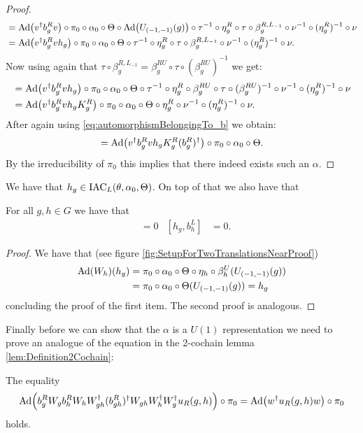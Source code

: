 \documentclass[12pt,a4paper,twoside]{article}
\numberwithin{equation}{section}
\begin{document}
\begin{proof}
	\begin{align}
		&=\Ad{v^\dagger b_g^R v}\circ\pi_0\circ\alpha_0\circ\Theta\circ\Ad{U_{(-1,-1)}(g)}\circ\tau^{-1}\circ\eta_g^R\circ\tau\circ\beta_g^{R,L_{-1}}\circ\nu^{-1}\circ(\eta_g^R)^{-1}\circ\nu\\
		&=\Ad{v^\dagger b_g^R vh_g}\circ\pi_0\circ\alpha_0\circ\Theta\circ\tau^{-1}\circ\eta_g^R\circ\tau\circ\beta_g^{R,L_{-1}}\circ\nu^{-1}\circ(\eta_g^R)^{-1}\circ\nu.
	\end{align}
	Now using again that $\tau\circ\beta_g^{R,L_{-1}}=\beta_{g}^{RU}\circ\tau\circ(\beta_g^{RU})^{-1}$ we get:
	\begin{align}
		&=\Ad{v^\dagger b_g^R vh_g}\circ\pi_0\circ\alpha_0\circ\Theta\circ\tau^{-1}\circ\eta_g^R\circ\beta_{g}^{RU}\circ\tau\circ(\beta_g^{RU})^{-1}\circ\nu^{-1}\circ(\eta_g^R)^{-1}\circ\nu\\
		&=\Ad{v^\dagger b_g^R vh_gK_g^R}\circ\pi_0\circ\alpha_0\circ\Theta\circ\eta_g^R\circ\nu^{-1}\circ(\eta_g^R)^{-1}\circ\nu.
	\end{align}
	After again using \eqref{eq:automorphismBelongingTo_b} we obtain:
	\begin{align}
		=\Ad{v^\dagger b_g^R vh_gK_g^R(b_g^R)^\dagger}\circ\pi_0\circ\alpha_0\circ\Theta.
	\end{align}
	By the irreducibility of $\pi_0$ this implies that there indeed exists such an $\alpha$.
\end{proof}
We have that $h_g\in\textrm{IAC}_L(\theta,\alpha_0,\Theta)$. On top of that we also have that
\begin{lemma}\label{lem:W_g_And_h_g_Commute}
	For all $g,h\in G$ we have that
	\begin{align}
		[h_g,W_h]&=0&[h_g,b_h^L]&=0.
	\end{align}
\end{lemma}
\begin{proof}
	We have that (see figure \ref{fig:SetupForTwoTranslationsNearProof})
	\begin{align}
		\Ad{W_h}(h_g)&=\pi_0\circ\alpha_0\circ\Theta\circ\eta_h\circ\beta_h^U(U_{(-1,-1)}(g))\\
		&=\pi_0\circ\alpha_0\circ\Theta(U_{(-1,-1)}(g))=h_g
	\end{align}
	concluding the proof of the first item. The second proof is analogous.
\end{proof}
Finally before we can show that the $\alpha$ is a $U(1)$ representation we need to prove an analogue of the equation in the 2-cochain lemma \ref{lem:Definition2Cochain}:
\begin{lemma}\label{lem:translating_u_R_To_The_Right_identity}
The equality
\begin{equation}
\Ad{b_g^R W_g b_h^R W_h W_{gh}^\dagger (b_{gh}^R)^\dagger W_{gh}W_h^\dagger W_g^\dagger u_R(g,h)}\circ\pi_0=\Ad{w^\dagger u_R(g,h) w}\circ\pi_0
\end{equation}
holds.
\end{lemma}
\end{document}
